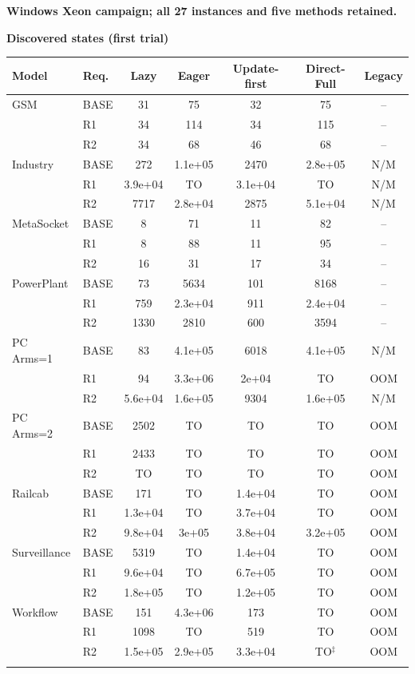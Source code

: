 \noindent\textbf{Windows Xeon campaign; all 27 instances and five methods retained.}\par
\clearpage\noindent\textbf{Discovered states (first trial)}\par\smallskip
\begingroup\scriptsize\setlength{\tabcolsep}{3pt}
\begin{tabular}{@{}llccccc@{}}
\toprule
Model & Req. & Lazy & Eager & Update-first & Direct-Full & Legacy\\
\midrule
GSM & BASE & 31 & 75 & 32 & 75 & --\\
 & R1 & 34 & 114 & 34 & 115 & --\\
 & R2 & 34 & 68 & 46 & 68 & --\\
\addlinespace[2pt]
Industry & BASE & 272 & 1.1e+05 & 2470 & 2.8e+05 & N/M\\
 & R1 & 3.9e+04 & TO & 3.1e+04 & TO & N/M\\
 & R2 & 7717 & 2.8e+04 & 2875 & 5.1e+04 & N/M\\
\addlinespace[2pt]
MetaSocket & BASE & 8 & 71 & 11 & 82 & --\\
 & R1 & 8 & 88 & 11 & 95 & --\\
 & R2 & 16 & 31 & 17 & 34 & --\\
\addlinespace[2pt]
PowerPlant & BASE & 73 & 5634 & 101 & 8168 & --\\
 & R1 & 759 & 2.3e+04 & 911 & 2.4e+04 & --\\
 & R2 & 1330 & 2810 & 600 & 3594 & --\\
\addlinespace[2pt]
PC Arms=1 & BASE & 83 & 4.1e+05 & 6018 & 4.1e+05 & N/M\\
 & R1 & 94 & 3.3e+06 & 2e+04 & TO & OOM\\
 & R2 & 5.6e+04 & 1.6e+05 & 9304 & 1.6e+05 & N/M\\
\addlinespace[2pt]
PC Arms=2 & BASE & 2502 & TO & TO & TO & OOM\\
 & R1 & 2433 & TO & TO & TO & OOM\\
 & R2 & TO & TO & TO & TO & OOM\\
\addlinespace[2pt]
Railcab & BASE & 171 & TO & 1.4e+04 & TO & OOM\\
 & R1 & 1.3e+04 & TO & 3.7e+04 & TO & OOM\\
 & R2 & 9.8e+04 & 3e+05 & 3.8e+04 & 3.2e+05 & OOM\\
\addlinespace[2pt]
Surveillance & BASE & 5319 & TO & 1.4e+04 & TO & OOM\\
 & R1 & 9.6e+04 & TO & 6.7e+05 & TO & OOM\\
 & R2 & 1.8e+05 & TO & 1.2e+05 & TO & OOM\\
\addlinespace[2pt]
Workflow & BASE & 151 & 4.3e+06 & 173 & TO & OOM\\
 & R1 & 1098 & TO & 519 & TO & OOM\\
 & R2 & 1.5e+05 & 2.9e+05 & 3.3e+04 & TO$^{\ddagger}$ & OOM\\
\addlinespace[2pt]
\bottomrule
\end{tabular}\endgroup

